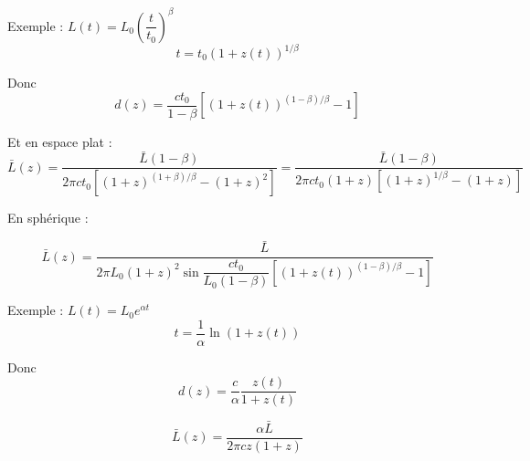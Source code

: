 \documentclass[11pt]{article} %
\begin{document}
Exemple : $L(t) = L_0 \left (\dfrac{t}{t_0} \right )  ^\beta$
\begin{equation}
t = t_0 \left (1+z(t) \right)^{1/\beta}
\end{equation}

Donc
\begin{equation}
d(z) = \dfrac{ct_0} {1-\beta} \left [ \left (1+z(t) \right)^{(1-\beta)/\beta} - 1 \right ]
\end{equation}

Et en espace plat :
\begin{equation}
\bar{L} (z) = \dfrac{\bar{L}(1-\beta)}{2\pi ct_0 \left [ (1+z)^{(1+\beta)/\beta}- (1+z)^2 \right ] } = \dfrac{\bar{L}(1-\beta)}{2\pi ct_0 \left(1+z \right ) \left [ (1+z)^{1/\beta}- (1+z) \right ] }
\end{equation}

En sphérique :

\begin{equation}
\bar{L} (z) = \dfrac{\bar{L}}{2\pi L_0 (1+z)^2 \sin\dfrac{ct_0} {L_0(1-\beta)} \left [ \left (1+z(t) \right)^{(1-\beta)/\beta} - 1 \right ]}
\end{equation}

Exemple : $L(t) = L_0 e^{\alpha t}$
\begin{equation}
t = \dfrac{1}{\alpha} \ln {\left (1+z(t) \right )}
\end{equation}

Donc
\begin{equation}
d(z) = \dfrac{c}{\alpha} \dfrac{z(t)}{1+z(t)}
\end{equation}

\begin{equation}
\bar{L} (z) = \dfrac{\alpha \bar{L}}{2\pi c z(1+z) }
\end{equation}
\end{document}
